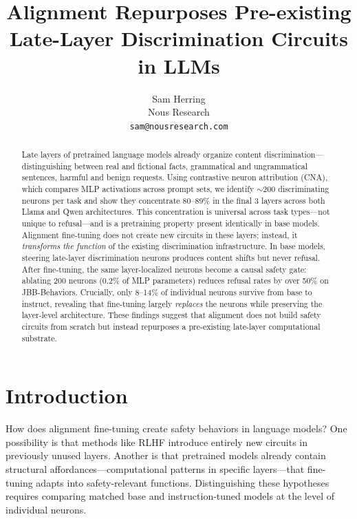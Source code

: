 \documentclass{article}
\title{Alignment Repurposes Pre-existing Late-Layer Discrimination Circuits in LLMs}
\author{
  Sam Herring \\
  Nous Research \\
  \texttt{sam@nousresearch.com}
}
\begin{document}
\maketitle

\begin{abstract}
Late layers of pretrained language models already organize content discrimination---distinguishing between real and fictional facts, grammatical and ungrammatical sentences, harmful and benign requests.
Using contrastive neuron attribution (CNA), which compares MLP activations across prompt sets, we identify ${\sim}200$ discriminating neurons per task and show they concentrate 80--89\% in the final 3 layers across both Llama and Qwen architectures.
This concentration is universal across task types---not unique to refusal---and is a pretraining property present identically in base models.
Alignment fine-tuning does not create new circuits in these layers; instead, it \emph{transforms the function} of the existing discrimination infrastructure.
In base models, steering late-layer discrimination neurons produces content shifts but never refusal.
After fine-tuning, the same layer-localized neurons become a causal safety gate: ablating 200 neurons (0.2\% of MLP parameters) reduces refusal rates by over 50\% on JBB-Behaviors.
Crucially, only 8--14\% of individual neurons survive from base to instruct, revealing that fine-tuning largely \emph{replaces} the neurons while preserving the layer-level architecture.
These findings suggest that alignment does not build safety circuits from scratch but instead repurposes a pre-existing late-layer computational substrate.
\end{abstract}

\section{Introduction}
\label{sec:intro}

How does alignment fine-tuning create safety behaviors in language models?
One possibility is that methods like RLHF introduce entirely new circuits in previously unused layers.
Another is that pretrained models already contain structural affordances---computational patterns in specific layers---that fine-tuning adapts into safety-relevant functions.
Distinguishing these hypotheses requires comparing matched base and instruction-tuned models at the level of individual neurons.
\end{document}
